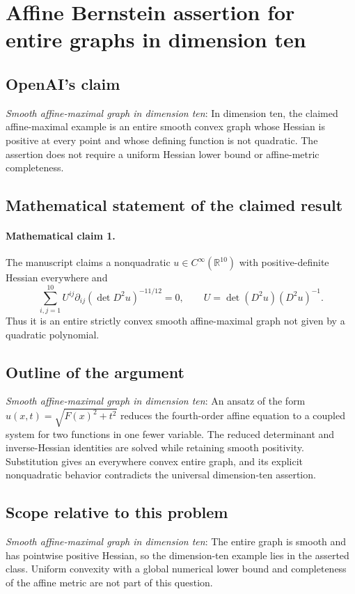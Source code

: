 \documentclass[11pt]{article}
\begin{document}
\section*{Affine Bernstein assertion for entire graphs in dimension ten}

\subsection{OpenAI's claim}
\textit{Smooth affine-maximal graph in dimension ten}: In dimension ten, the claimed affine-maximal example is an entire smooth convex graph whose Hessian is positive at every point and whose defining function is not quadratic. The assertion does not require a uniform Hessian lower bound or affine-metric completeness.

\subsection{Mathematical statement of the claimed result}
\paragraph{Mathematical claim 1.} The manuscript claims a nonquadratic $u\in C^\infty(\mathbb R^{10})$ with positive-definite Hessian everywhere and \[\sum_{i,j=1}^{10}U^{ij}\partial_{ij}(\det D^2u)^{-11/12}=0,\qquad U=\det(D^2u)(D^2u)^{-1}.\] Thus it is an entire strictly convex smooth affine-maximal graph not given by a quadratic polynomial.

\subsection{Outline of the argument}
\textit{Smooth affine-maximal graph in dimension ten}: An ansatz of the form $u(x,t)=\sqrt{F(x)^2+t^2}$ reduces the fourth-order affine equation to a coupled system for two functions in one fewer variable. The reduced determinant and inverse-Hessian identities are solved while retaining smooth positivity. Substitution gives an everywhere convex entire graph, and its explicit nonquadratic behavior contradicts the universal dimension-ten assertion.

\subsection{Scope relative to this problem}
\textit{Smooth affine-maximal graph in dimension ten}: The entire graph is smooth and has pointwise positive Hessian, so the dimension-ten example lies in the asserted class. Uniform convexity with a global numerical lower bound and completeness of the affine metric are not part of this question.
\end{document}
